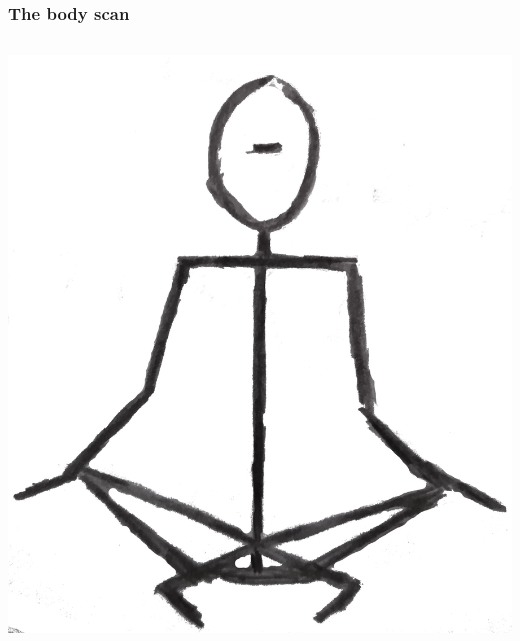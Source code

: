 \documentclass{beamer}
\begin{document}
\begin{frame}
  \frametitle{The body scan}
\begin{columns}[c] %
\includegraphics[width=1\linewidth]{Sitting_floor_front}

  
  \end{columns}
\end{frame}
\end{document}
